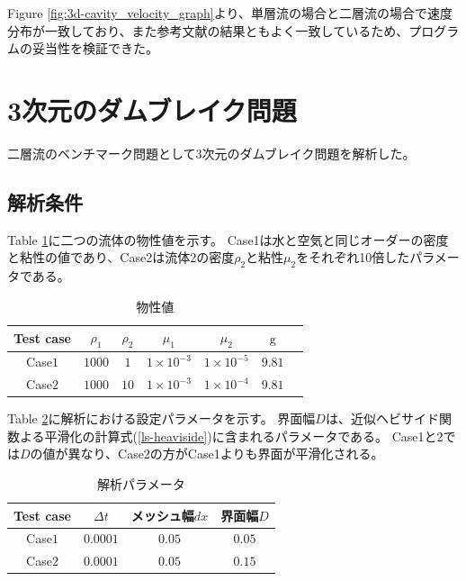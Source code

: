 \documentclass[8pt,a4paper]{article}
\begin{document}
Figure \ref{fig:3d-cavity_velocity_graph}より、単層流の場合と二層流の場合で速度分布が一致しており、また参考文献\cite{Lo2005}の結果ともよく一致しているため、プログラムの妥当性を検証できた。

\newpage
\section{3次元のダムブレイク問題}
二層流のベンチマーク問題として3次元のダムブレイク問題を解析した。

\subsection{解析条件}

Table \ref{table:dambreak-material-property}に二つの流体の物性値を示す。
Case1は水と空気と同じオーダーの密度と粘性の値であり、Case2は流体2の密度$\rho_2$と粘性$\mu_2$をそれぞれ10倍したパラメータである。
\renewcommand{\arraystretch}{1}
\begin{table}[H]
	\centering
	\caption{物性値}
	\begin{tabular}{ccccccc}
		\hline
		Test case & $\rho_1$ & $\rho_2$ & $\mu_1$ & $\mu_2$ & $\mathrm{g}$ \\
		\hline 
		Case$1$ & $1000$ & $1$   & $1\times10^{-3}$ & $1\times10^{-5}$ & $9.81$ \\
		Case$2$ & $1000$ & $10$  & $1\times10^{-3}$ & $1\times10^{-4}$ & $9.81$ \\
		\hline         
	\end{tabular}
	\label{table:dambreak-material-property}
\end{table}
\renewcommand{\arraystretch}{1.0}

Table \ref{table:dambreak-parameter}に解析における設定パラメータを示す。
界面幅$D$は、近似ヘビサイド関数よる平滑化の計算式(\ref{ls-heaviside})に含まれるパラメータである。
Case1と2では$D$の値が異なり、Case2の方がCase1よりも界面が平滑化される。
\renewcommand{\arraystretch}{1}
\begin{table}[H]
	\centering
	\caption{解析パラメータ}
	\begin{tabular}{cccc}
		\hline
		Test case & $\Delta t$ & メッシュ幅$dx$ & 界面幅$D$\\
		\hline 
		Case$1$ & $0.0001$ & $0.05$ & $0.05$\\
		Case$2$ & $0.0001$ & $0.05$ & $0.15$\\
		\hline         
	\end{tabular}
	\label{table:dambreak-parameter}
\end{table}
\renewcommand{\arraystretch}{1.0}
\end{document}
